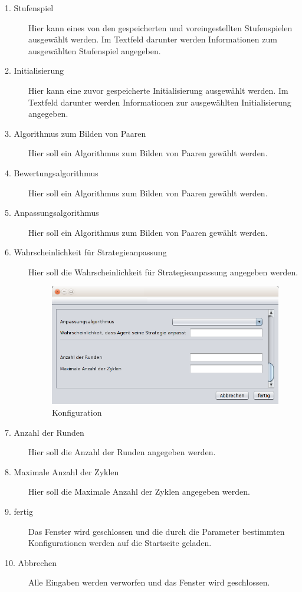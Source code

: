 \begin{description}

\item[1. Stufenspiel] Hier kann eines von den gespeicherten und voreingestellten Stufenspielen ausgewählt werden. Im Textfeld darunter werden Informationen zum ausgewählten Stufenspiel angegeben.

\item[2. Initialisierung] Hier kann eine zuvor gespeicherte Initialisierung ausgewählt werden. Im Textfeld darunter werden Informationen zur ausgewählten Initialisierung angegeben.

\item[3. Algorithmus zum Bilden von Paaren] Hier soll ein Algorithmus zum Bilden von Paaren gewählt werden. 

\item[4. Bewertungsalgorithmus] Hier soll ein Algorithmus zum Bilden von Paaren gewählt werden.

\item[5. Anpassungsalgorithmus] Hier soll ein Algorithmus zum Bilden von Paaren gewählt werden.

\item[6. Wahrscheinlichkeit für Strategieanpassung] Hier soll die Wahrscheinlichkeit für Strategieanpassung angegeben werden.

\begin{figure}[!h] 
  \centering
     \includegraphics[width=1.0\textwidth]{GUI_Entwurf/NeueKonfiguration2.png}
  \caption{Konfiguration}
  \label{fig:Bild2}
\end{figure}

\item[7. Anzahl der Runden] Hier soll die Anzahl der Runden angegeben werden.

\item[8. Maximale Anzahl der Zyklen] Hier soll die Maximale Anzahl der Zyklen angegeben werden.

\item[9. fertig] Das Fenster wird geschlossen und die durch die Parameter bestimmten Konfigurationen werden auf die Startseite geladen.

\item[10. Abbrechen] Alle Eingaben werden verworfen und das Fenster wird geschlossen.


\end{description}

